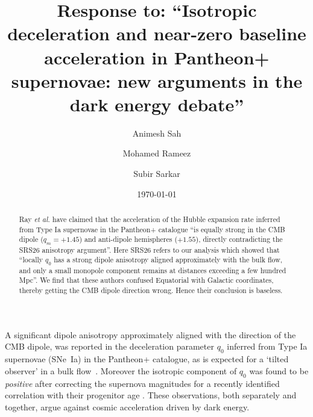 \documentclass[aps,prl,twocolumn,showpacs,superscriptaddress,floatfix]{revtex4-2}
\begin{document}
\title{Response to: ``Isotropic deceleration and near-zero baseline acceleration in Pantheon+ supernovae: new arguments in the dark energy debate''}

\author{Animesh Sah}

\author{Mohamed Rameez}

\author{Subir Sarkar}


\date{\today}

\begin{abstract}
Ray \emph{et al.} \cite{Ray:2026hdi} have claimed that the acceleration of the Hubble expansion rate inferred from Type Ia supernovae in the Pantheon+ catalogue ``is equally strong in the CMB dipole ($q_m = + 1.45$) and anti-dipole hemispheres ($+ 1.55$), directly contradicting the SRS26 anisotropy argument''. Here SRS26 refers to our analysis \cite{Sah:2026mgk} which showed that ``locally $q_0$ has a strong dipole anisotropy aligned approximately with the bulk flow, and only a small monopole component remains at distances exceeding a few hundred Mpc''. We find  that these authors confused Equatorial with Galactic coordinates, thereby getting the CMB dipole direction wrong. Hence their conclusion is baseless.

\end{abstract}


\maketitle

A significant dipole anisotropy approximately aligned with the direction of the CMB dipole, was reported \cite{Sah:2026mgk} in the deceleration parameter $q_0$ inferred from Type Ia supernovae (SNe~Ia) in the Pantheon+ catalogue, as is expected for a `tilted observer' in a bulk flow~\cite{Sah:2024csa}. Moreover the isotropic component of $q_0$ was found to be \emph{positive} after correcting the supernova magnitudes for a recently identified correlation with their progenitor age \cite{Chung:2025cgv,Chung:2026jhm}. These observations, both separately and together, argue against cosmic acceleration driven by dark energy.
\end{document}
